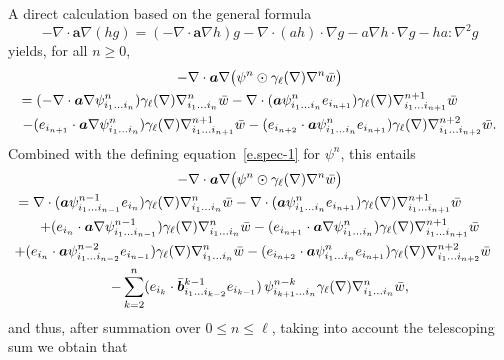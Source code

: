 \documentclass[10pt]{amsart}
\theoremstyle{plain}
\theoremstyle{definition}
\numberwithin{equation}{section}
\newcommand{\ee}{e}
\newcommand{\Aa}{\boldsymbol a}
\newcommand{\bb}{{\boldsymbol b}}
\begin{document}
A direct calculation {based on the general formula\vspace*{-3pt}
\[
-\nabla\cdot \Aa\nabla(hg)=(-\nabla\cdot\Aa\nabla h)g-\nabla\cdot(ah)\cdot\nabla g-a\nabla h\cdot\nabla g-ha:\nabla^2g
\]
yields, for all $n\ge0$,\vspace*{-3pt}
\begin{multline*}
-\nabla \cdot \Aa \nabla \big( \psi^n \odot \gamma_\ell(\nabla) \nabla^n \bar w\big)
\\
\hspace*{-1cm}= (-\nabla \cdot \Aa \nabla \psi^n_{i_1\ldots i_n}) \gamma_\ell(\nabla) \nabla^n_{i_1\ldots i_n} \bar w
-\nabla \cdot (\Aa \psi^n_{i_1\ldots i_n} e_{i_{n+1}}) \gamma_\ell(\nabla) \nabla^{n+1}_{i_1\ldots i_{n+1}} \bar w
\\
-(\ee_{i_{n+1}}\cdot\Aa \nabla \psi^n_{i_1\ldots i_n}) \gamma_\ell(\nabla) \nabla^{n+1}_{i_1\ldots i_{n+1}} \bar w- (\ee_{i_{n+2}}\cdot\Aa \psi^n_{i_1\ldots i_n} e_{i_{n+1}})\gamma_\ell(\nabla) \nabla^{n+2}_{i_1\ldots i_{n+2}} \bar w.
\end{multline*}
Combined with the defining equation~\eqref{e.spec-1} for $\psi^n$, this entails\vspace*{-3pt}
\begin{multline*}
-\nabla \cdot \Aa \nabla \big( \psi^n \odot \gamma_\ell(\nabla) \nabla^n \bar w\big)
\\
\hspace*{-1cm}= \nabla\cdot(\Aa\psi^{n-1}_{i_1\ldots i_{n-1}}\ee_{i_n}) \gamma_\ell(\nabla) \nabla^n_{i_1\ldots i_n} \bar w
-\nabla \cdot (\Aa \psi^n_{i_1\ldots i_n} e_{i_{n+1}}) \gamma_\ell(\nabla) \nabla^{n+1}_{i_1\ldots i_{n+1}} \bar w\\
+(\ee_{i_n}\cdot\Aa\nabla\psi^{n-1}_{i_1\ldots i_{n-1}})\gamma_\ell(\nabla) \nabla^n_{i_1\ldots i_n} \bar w
-(\ee_{i_{n+1}}\cdot\Aa \nabla \psi^n_{i_1\ldots i_n}) \gamma_\ell(\nabla) \nabla^{n+1}_{i_1\ldots i_{n+1}} \bar w\\
\shoveright{+(\ee_{i_n}\cdot\Aa\psi^{n-2}_{i_1\ldots i_{n-2}}\ee_{i_{n-1}})\gamma_\ell(\nabla) \nabla^n_{i_1\ldots i_n} \bar w
-(\ee_{i_{n+2}}\cdot\Aa \psi^n_{i_1\ldots i_n} e_{i_{n+1}})\gamma_\ell(\nabla) \nabla^{n+2}_{i_1\ldots i_{n+2}} \bar w}\\
-\sum_{k=2}^{n}(\ee_{i_{k}}\cdot\bar\bb{}^{k-1}_{i_1\ldots i_{k-2}}\ee_{i_{k-1}})\,\psi^{n-k}_{i_{k+1}\ldots i_n}\gamma_\ell(\nabla) \nabla^n_{i_1\ldots i_n} \bar w,
\end{multline*}
and thus, after summation over $0\le n\le\ell$, {taking into account the telescoping sum we obtain that}\vspace*{-5pt}
}
\end{document}

